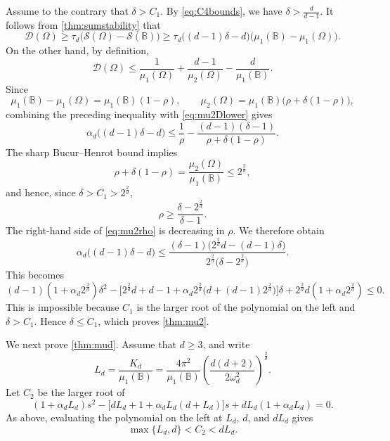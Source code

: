 \documentclass{amsart}
\numberwithin{equation}{section}
\theoremstyle{plain}
\theoremstyle{definition}
\theoremstyle{plain}
\theoremstyle{remark}
\numberwithin{figure}{section}
\newcommand{\B}{\mathbb{B}}
\newcommand{\D}{\mathcal{D}(\Omega)}
\newcommand{\s}{\mathcal{S}(\Omega)}
\begin{document}
Assume to the contrary that $\delta>C_1$. By \cref{eq:C4bounds}, we have $\delta>\frac{d}{d-1}$. It follows from \cref{thm:sumstability} that
\begin{equation}
    \label{eq:mu2Dlower}
    \D\geq\tau_d\big(\s-\mathcal{S}(\B)\big)\geq\tau_d\big((d-1)\delta-d\big)\big(\mu_1(\B)-\mu_1(\Omega)\big).
\end{equation}
On the other hand, by definition,  
\[
    \D\leq\frac{1}{\mu_1(\Omega)}+\frac{d-1}{\mu_2(\Omega)}-\frac{d}{\mu_1(\B)}.
\]
Since
\[
    \mu_1(\B)-\mu_1(\Omega)=\mu_1(\B)(1-\rho),\qquad \mu_2(\Omega)=\mu_1(\B)\big(\rho+\delta(1-\rho)\big),
\]
combining the preceding inequality with \cref{eq:mu2Dlower} gives
\begin{equation}
    \label{eq:mu2rho}
    \alpha_d\big((d-1)\delta-d\big)\leq\frac{1}{\rho}-\frac{(d-1)(\delta-1)}{\rho+\delta(1-\rho)}.
\end{equation}
The sharp Bucur--Henrot bound \cite{BH19} implies
\[
    \rho+\delta(1-\rho)=\frac{\mu_2(\Omega)}{\mu_1(\B)}\leq2^{\frac{2}{d}},
\]
and hence, since $\delta>C_1>2^{\frac{2}{d}}$,
\[
    \rho\geq\frac{\delta-2^{\frac{2}{d}}}{\delta-1}.
\]
The right-hand side of \cref{eq:mu2rho} is decreasing in $\rho$. We therefore obtain
\[
    \alpha_d\big((d-1)\delta-d\big)\leq\frac{(\delta-1)\big(2^{\frac{2}{d}}d-(d-1)\delta\big)}{2^{\frac{2}{d}}\big(\delta-2^{\frac{2}{d}}\big)}.
\]
This becomes
\[
    (d-1)(1+\alpha_d 2^{\frac{2}{d}} )\delta^2-\big[2^{\frac{2}{d}} d +d-1+\alpha_d 2^{\frac{2}{d}} \big(d+(d-1) 2^{\frac{2}{d}} \big)\big]\delta+ 2^{\frac{2}{d}} d (1+\alpha_d 2^{\frac{2}{d}} )\leq0.
\]
This is impossible because $C_1$ is the larger root of the polynomial on the left and $\delta>C_1$. Hence $\delta\leq C_1$, which proves \cref{thm:mu2}.

We next prove \cref{thm:mud}. Assume that $d\geq3$, and write
\[
    L_d=\frac{K_d}{\mu_1(\B)}= \frac{4\pi^2}{\mu_1(\B)} \left(\frac{d(d+2)}{2\omega_d^2}\right)^{\frac{2}{d}}.
\]
Let $C_2$ be the larger root of
\begin{equation}
    \label{eq:C5}
    (1+\alpha_dL_d)s^2-\big[dL_d+1+\alpha_dL_d(d+L_d)\big]s+dL_d(1+\alpha_dL_d)=0.
\end{equation}
As above, evaluating the polynomial on the left at $L_d$, $d$, and $dL_d$ gives
\begin{equation}
    \label{eq:C5bounds}
    \max\{L_d,d\}<C_2<dL_d.
\end{equation}
\end{document}
